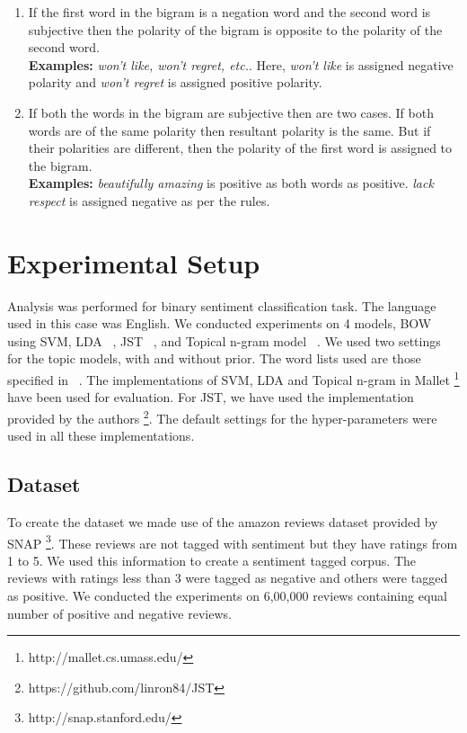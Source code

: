 \documentclass[11pt]{article}
\begin{document}
\begin{enumerate}
 \itemsep0em
 \item If the first word in the bigram is a negation word and the second word is subjective then the polarity
 of the bigram is opposite to the polarity of the second word. \\
 \textbf{Examples:} \textit{won't like, won't regret, etc.}. Here, \textit{won't like} is assigned negative
 polarity and \textit{won't regret} is assigned positive polarity.
 \item If both the words in the bigram are subjective then are two cases. If both words are of the same polarity
 then resultant polarity is the same. But if their polarities are different, then the polarity of the first word
 is assigned to the bigram. \\
 \textbf{Examples:} \textit{beautifully amazing} is positive as both words as positive. \textit{lack respect} is
 assigned negative as per the rules.
\end{enumerate}

\section{Experimental Setup}\label{experiments}

Analysis was performed for binary sentiment classification task. The language used in this case was English.
We conducted experiments on 4 models, BOW using SVM, LDA ~\cite{blei2003latent}, JST ~\cite{lin2009joint}, and 
Topical n-gram model ~\cite{wang2007topical}. We used two settings for the topic models, with and without prior. 
The word lists used are those specified in ~\cite{liu2010sentiment}. The implementations of SVM, LDA and Topical
n-gram in Mallet \footnote{http://mallet.cs.umass.edu/} have been used for evaluation. For JST, we have used the 
implementation provided by the authors \footnote{https://github.com/linron84/JST}. The default settings for the
hyper-parameters were used in all these implementations.


\subsection*{Dataset}

To create the dataset we made use of the amazon reviews dataset provided by SNAP \footnote{http://snap.stanford.edu/}.
These reviews are not tagged with sentiment but they have ratings from 1 to 5. We used this information to create
a sentiment tagged corpus. The reviews with ratings less than 3 were tagged as negative and others were tagged
as positive. We conducted the experiments on 6,00,000 reviews containing equal number of positive and negative
reviews.
\end{document}
